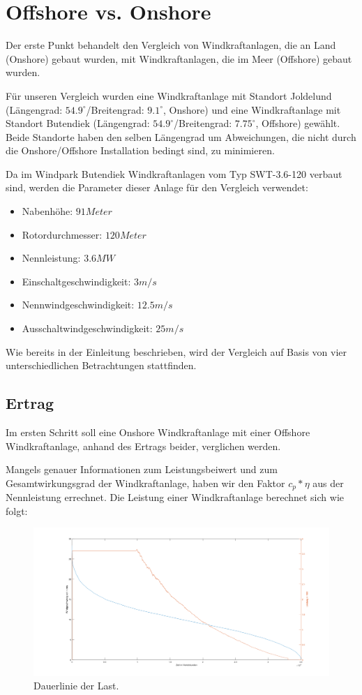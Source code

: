 \documentclass[a4paper,12pt]{article}
\begin{document}
	\section{Offshore vs. Onshore}
	Der erste Punkt behandelt den Vergleich von Windkraftanlagen, die an Land (Onshore) gebaut wurden, mit Windkraftanlagen, die im Meer (Offshore) gebaut wurden.\\ \par
	\noindent Für unseren Vergleich wurden eine Windkraftanlage mit Standort Joldelund (Längengrad: $54.9^{\circ}$/Breitengrad: $9.1^{\circ}$, Onshore) und eine Windkraftanlage mit Standort Butendiek (Längengrad: $54.9^{\circ}$/Breitengrad: $7.75^{\circ}$, Offshore) gewählt. Beide Standorte haben den selben Längengrad um Abweichungen, die nicht durch die Onshore/Offshore Installation bedingt sind, zu minimieren.\\ \par \noindent Da im Windpark Butendiek Windkraftanlagen vom Typ SWT-3.6-120 verbaut sind, werden die Parameter dieser Anlage für den Vergleich verwendet:
	\begin{itemize}
		\item Nabenhöhe: $91 Meter$
		\item Rotordurchmesser: $120 Meter$
		\item Nennleistung: $3.6MW$
		\item Einschaltgeschwindigkeit: $3m/s$
		\item Nennwindgeschwindigkeit: $12.5m/s$
		\item Ausschaltwindgeschwindigkeit: $25m/s$
	\end{itemize}
	\noindent Wie bereits in der Einleitung beschrieben, wird der Vergleich auf Basis von vier unterschiedlichen Betrachtungen stattfinden.
	\subsection{Ertrag}
	Im ersten Schritt soll eine Onshore Windkraftanlage mit einer Offshore Windkraftanlage, anhand des Ertrags beider, verglichen werden.\\ \par
	\noindent Mangels genauer Informationen zum Leistungsbeiwert und zum Gesamtwirkungsgrad der Windkraftanlage, haben wir den Faktor $c_p * \eta$ aus der Nennleistung errechnet.\newline
	Die Leistung einer Windkraftanlage berechnet sich wie folgt:

	\begin{figure}[H]
		\centering
		\includegraphics[width=12cm]{img/results/Dauerlinie_Offshore}
		\caption{Dauerlinie der Last.}
	\end{figure}
\end{document}
